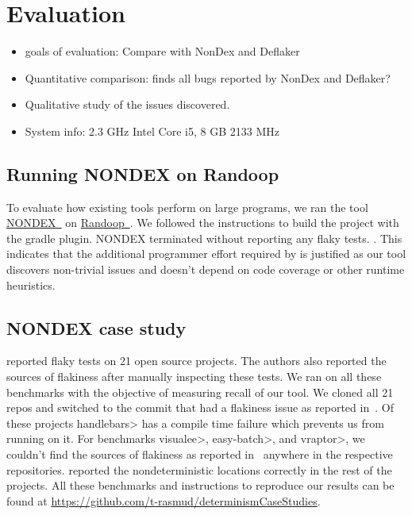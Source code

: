 \section{Evaluation}
\begin{itemize}
    \item goals of evaluation: Compare with NonDex and Deflaker
    \item Quantitative comparison: \TheDeterminismChecker finds all bugs reported by NonDex and Deflaker?
    \item Qualitative study of the issues discovered.
    \item System info: 2.3 GHz Intel Core i5, 8 GB 2133 MHz
\end{itemize}

\subsection{Running NONDEX on Randoop}
To evaluate how existing tools perform on large programs, we ran the tool \href{https://github.com/TestingResearchIllinois/NonDex}{NONDEX~\cite{nondex}} on 
\href{https://github.com/randoop/randoop}{Randoop~\cite{randoop}}.
We followed the instructions to build the project with the gradle plugin. 
NONDEX terminated without reporting any flaky tests.
.
This indicates that the additional programmer effort required by \TheDeterminismChecker is justified
as our tool discovers non-trivial issues and doesn't depend on code coverage or other runtime heuristics.

\subsection{NONDEX case study}
\cite{nondex} reported flaky tests on 21 open source projects. The authors also reported the sources of flakiness
after manually inspecting these tests. We ran \TheDeterminismChecker on all these benchmarks with the objective
of measuring recall of our tool. We cloned all 21 repos and switched to the commit that had a flakiness issue as reported 
in~\cite{nondex}. Of these projects \<handlebars> has a compile time failure which prevents us from running \TheDeterminismChecker on it. For benchmarks \<visualee>, \<easy-batch>, and \<vraptor>, we couldn't find
the sources of flakiness as reported in~\cite{nondex} anywhere in the respective repositories.
\TheDeterminismChecker reported the nondeterministic locations correctly in the rest of the projects.
All these benchmarks and instructions to reproduce our results can be found at \href{https://github.com/t-rasmud/determinismCaseStudies}{https://github.com/t-rasmud/determinismCaseStudies}.

